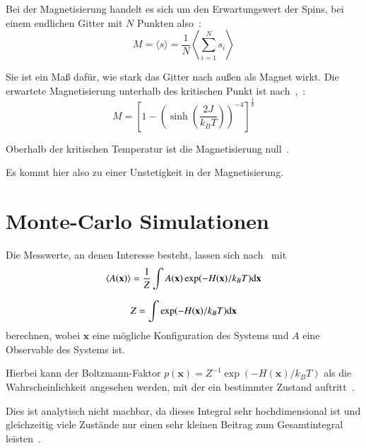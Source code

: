 	Bei der Magnetisierung handelt es sich um den Erwartungswert der Spins, bei einem endlichen Gitter mit $N$ Punkten also~\cite[vgl. ][S. 8]{binderheermann}:
	\begin{equation}
	M=\langle s \rangle=\frac{1}{N}\left\langle  \sum_{i=1}^{N} s_i \right\rangle
	\label{eq:magnetisierung}
	\end{equation}

	
	Sie ist ein Maß dafür, wie stark das Gitter nach außen als Magnet wirkt. Die erwartete Magnetisierung unterhalb des kritischen Punkt ist nach~\cite{YangMagnetization},~\cite{MontrollMagnetization}:
	\begin{equation} M=\left[1-\left(\sinh\left(\frac{2J}{k_BT}\right)\right)^{-4}\right]^{\frac{1}{8}}
	\label{eq:magnetisierungsgleichungliteratur}
	\end{equation}
	
	Oberhalb der kritischen Temperatur ist die Magnetisierung null~\cite[Gl. 81]{MontrollMagnetization}.
	
	Es kommt hier also zu einer Unstetigkeit in der Magnetisierung.
	
	\section{Monte-Carlo Simulationen}
	\label{sec:mctheorie}
	Die Messwerte, an denen Interesse besteht, lassen sich nach~\cite[S. 8]{binderheermann}  mit \[
	\langle A(\mathbf{x}) \rangle=\frac{1}{Z}\int A(\mathbf{x}) \exp(-H(\mathbf{x})/k_BT)\text{d} \mathbf{x}\]
	
	\[
	Z=\int \exp(-H(\mathbf{x})/k_BT) \text{d} \mathbf{x}
	\]
	berechnen, wobei $\mathbf{x}$ eine mögliche Konfiguration des Systems und $A$ eine Observable des Systems ist.
	
	
	Hierbei kann der Boltzmann-Faktor $p(\mathbf{x})=Z^{-1} \exp(-H(\mathbf{x})/k_BT)$ als die Wahrscheinlichkeit angesehen werden, mit der ein bestimmter Zustand auftritt~\cite[vgl. ][S. 8 f.]{binderheermann}.
	
	Dies ist analytisch nicht machbar, da dieses Integral sehr hochdimensional ist und gleichzeitig viele Zustände nur einen sehr kleinen Beitrag zum Gesamtintegral leisten~\cite[vgl. ][S. 9]{binderheermann}.
	
